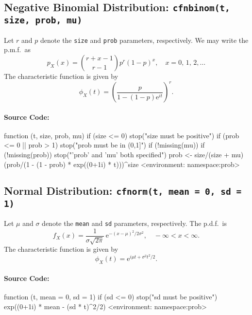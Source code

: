 \documentclass[english]{article}
\newcommand{\me}{\mathrm{e}}
\begin{document}
\subsection{Negative Binomial Distribution: \texttt{cfnbinom(t, size, prob, mu)}\label{sub:Negative-Binomial-Distribution}}

Let $r$ and $p$ denote the \texttt{size} and \texttt{prob} parameters,
respectively. We may write the p.m.f.~as\[
p_{X}(x)={r+x-1 \choose r-1}p^{r}(1-p)^{x},\quad x=0,\,1,\,2,\ldots\]
The characteristic function is given by\[
\phi_{X}(t)=\left(\frac{p}{1-(1-p)\me^{it}}\right)^{r}.\]



\paragraph*{Source Code:}

\begin{Schunk}
\begin{Soutput}
function (t, size, prob, mu) 
{
    if (size <= 0) 
        stop("size must be positive")
    if (prob <= 0 || prob > 1) 
        stop("prob must be in (0,1]")
    if (!missing(mu)) {
        if (!missing(prob)) 
            stop("'prob' and 'mu' both specified")
        prob <- size/(size + mu)
    }
    (prob/(1 - (1 - prob) * exp((0+1i) * t)))^size
}
<environment: namespace:prob>
\end{Soutput}
\end{Schunk}


\subsection{Normal Distribution: \texttt{cfnorm(t, mean = 0, sd = 1)}}

Let $\mu$ and $\sigma$ denote the \texttt{mean} and \texttt{sd}
parameters, respectively. The p.d.f.~is\[
f_{X}(x)=\frac{1}{\sigma\sqrt{2\pi}}\,\me^{-(x-\mu)^{2}/2\sigma^{2}},\quad-\infty<x<\infty.\]
The characteristic function is given by \[
\phi_{X}(t)=\me^{i\mu t+\sigma^{2}t^{2}/2}.\]



\paragraph*{Source Code:}

\begin{Schunk}
\begin{Soutput}
function (t, mean = 0, sd = 1) 
{
    if (sd <= 0) 
        stop("sd must be positive")
    exp((0+1i) * mean - (sd * t)^2/2)
}
<environment: namespace:prob>
\end{Soutput}
\end{Schunk}
\end{document}
